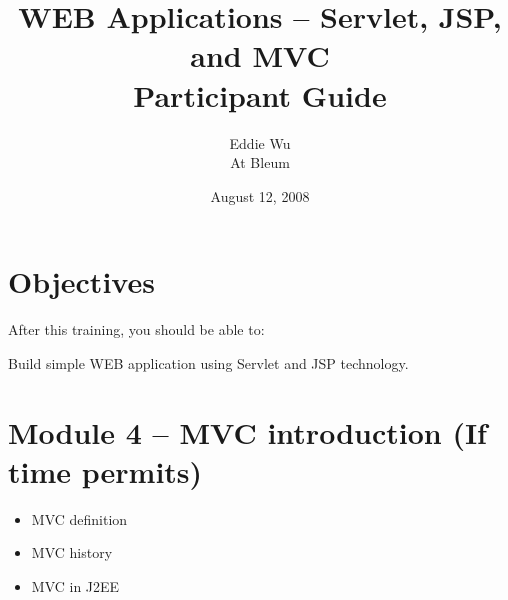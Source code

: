 \documentclass[a4paper,12pt]{article}
\title{WEB Applications -- Servlet, JSP, and MVC\\
Participant Guide}
\author{Eddie Wu\\
        At Bleum}
\date{August 12, 2008}
\begin{document}
\maketitle


\tableofcontents
\listoffigures
\listoftables
\newpage



\section{Objectives}
After this training, you should be able to: 

     Build simple WEB application using Servlet and JSP technology.







\section{Module 4 -- MVC introduction (If time permits)}
\begin{itemize}
\item MVC definition
\item MVC history
\item MVC in J2EE 
\end{itemize}
\end{document}
